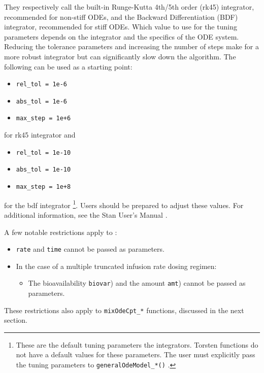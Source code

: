 \documentclass[11pt, reqno]{amsbook}
\numberwithin{section}{chapter}
\theoremstyle{remark}
\begin{document}
They respectively call the built-in Runge-Kutta 4th/5th order (rk45)
integrator, recommended for non-stiff ODEs, and the Backward
Differentiation (BDF) integrator, recommended for stiff ODEs. Which
value to use for the tuning parameters depends on the integrator and
the specifics of the ODE system. Reducing the tolerance parameters and
increasing the number of steps make for a more robust integrator but
can significantly slow down the algorithm. The following can be used
as a starting point: 
\begin{itemize}
\item \texttt{rel\_tol = 1e-6}
\item \texttt{abs\_tol = 1e-6}
\item \texttt{max\_step = 1e+6}
\end{itemize}
for rk45 integrator and
\begin{itemize}
\item \texttt{rel\_tol = 1e-10}
\item \texttt{abs\_tol = 1e-10}
\item \texttt{max\_step = 1e+8}
\end{itemize}
for the bdf integrator \footnote{These are the default tuning parameters the integrators. Torsten functions do not have a default values for these parameters. The user must explicitly pass the tuning parameters to \texttt{generalOdeModel\_*()} .}.
Users should be prepared to adjust these
values. For additional information, see the Stan User's
Manual \cite{stan_team_2017}.

A few notable restrictions apply to :
\begin{itemize}
\item \texttt{rate} and \texttt{time} cannot be passed as parameters.
\item In the case of a multiple truncated infusion rate dosing regimen:
\begin{itemize}
\item The bioavailability \texttt{biovar}) and the amount \texttt{amt}) cannot be passed as parameters.
\end{itemize}
\end{itemize}
These restrictions also apply to \texttt{mixOdeCpt\_*} functions, discussed in the next section.
\end{document}

